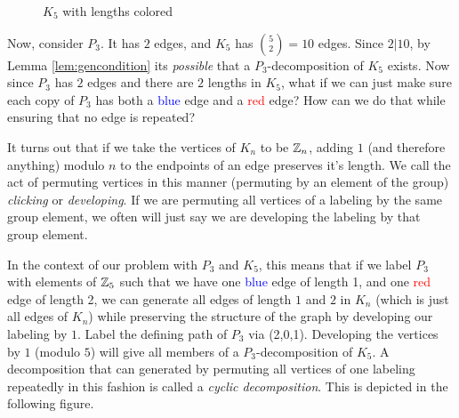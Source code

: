 \begin{figure}[H]
  \begin{center}
  \end{center}
  \caption{$K_{5}$ with lengths colored}
  \label{fig:K5colored}
\end{figure}
Now, consider $P_{3}$. It has $2$ edges, and $K_{5}$ has $\binom{5}{2}=10$ edges. Since $2|10$, by Lemma \ref{lem:gencondition} its \textit{possible} that a $P_{3}$-decomposition of $K_{5}$ exists. Now since $P_{3}$ has $2$ edges and there are $2$ lengths in $K_{5}$, what if we can just make sure each copy of $P_{3}$ has both a \textcolor{blue}{blue} edge and a \textcolor{red}{red} edge? How can we do that while ensuring that no edge is repeated?

It turns out that if we take the vertices of $K_{n}$ to be $\mathbb{Z}_{n}$, adding $1$ (and therefore anything) modulo $n$ to the endpoints of an edge preserves it's length. We call the act of permuting vertices in this manner (permuting by an element of the group) \textit{clicking} or \textit{developing}. If we are permuting all vertices of a labeling by the same group element, we often will just say we are developing the labeling by that group element.

In the context of our problem with $P_{3}$ and $K_{5}$, this means that if we label $P_{3}$ with elements of $\mathbb{Z}_{5}$ such that we have one \textcolor{blue}{blue} edge of length 1, and one \textcolor{red}{red} edge of length 2, we can generate all edges of length $1$ and $2$ in $K_{n}$ (which is just all edges of $K_{n}$) while preserving the structure of the graph by developing our labeling by $1$. Label the defining path of $P_{3}$ via (2,0,1). Developing the vertices by $1$ (modulo $5$) will give all members of a $P_{3}$-decomposition of $K_{5}$. A decomposition that can generated by permuting all vertices of one labeling repeatedly in this fashion is called a \textit{cyclic decomposition}. This is depicted in the following figure.

